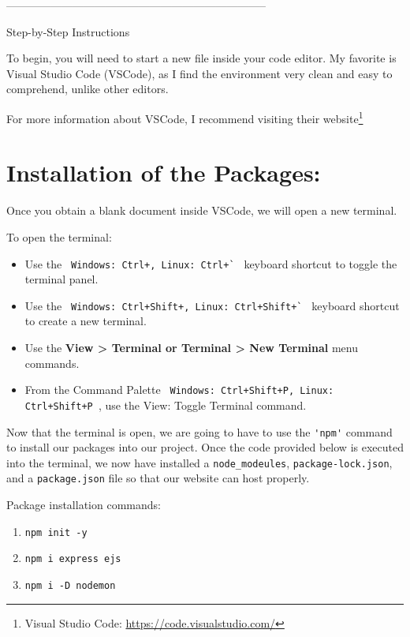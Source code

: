 \documentclass[a4paper,12pt]{article}
\begin{document}
\begin{center}
    -----------------------------------------------------------------------
\end{center}

\begin{center}
\begin{large}
    Step-by-Step Instructions
\end{large}
\end{center}


To begin, you will need to start a new file inside your code editor. My favorite is Visual Studio Code (VSCode), as I find the environment very clean and easy to comprehend, unlike other editors.
\begin{footnotesize}
For more information about VSCode, I recommend visiting their website\footnote{Visual Studio Code: \url{https://code.visualstudio.com/}} 
\end{footnotesize}

\section{Installation of the Packages:}

Once you obtain a blank document inside VSCode, we will open a new terminal.

To open the terminal:

\begin{itemize}
  \item Use the \verb| Windows: Ctrl+, Linux: Ctrl+` | keyboard shortcut to toggle the terminal panel.
  \item Use the \verb| Windows: Ctrl+Shift+, Linux: Ctrl+Shift+` | keyboard shortcut to create a new terminal.
  \item Use the \textbf{View > Terminal or Terminal > New Terminal} menu commands.
  \item From the Command Palette \verb| Windows: Ctrl+Shift+P, Linux: Ctrl+Shift+P |, use the View: Toggle Terminal command.
\end{itemize}



\pagebreak Now that the terminal is open, we are going to have to use the \verb|'npm'| command to install our packages into our project. Once the code provided below is executed into the terminal, we now have installed a \verb|node_modeules|, \verb|package-lock.json|, and a \verb|package.json| file so that our website can host properly.

Package installation commands:
\begin{enumerate}
  \item \verb|npm init -y|
  \item \verb|npm i express ejs|
  \item \verb|npm i -D nodemon|
\end{enumerate}
\end{document}

